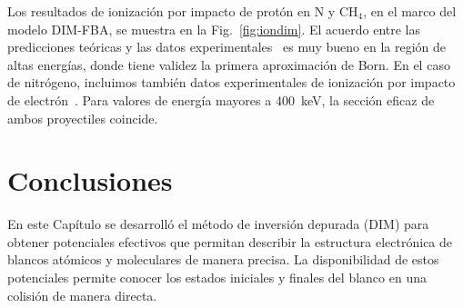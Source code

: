 Los resultados de ionización por impacto de protón en N y CH$_4$, 
en el marco del modelo DIM-FBA, se muestra en la Fig.~\ref{fig:iondim}. 
El acuerdo entre las predicciones teóricas y las datos 
experimentales~\cite{Rudd:83,Rudd:85} es muy bueno en la región de altas 
energías, donde tiene validez la primera aproximación de Born. En el 
caso de nitrógeno, incluimos también datos experimentales de ionización 
por impacto de electrón~\cite{Brook:78}. Para valores de energía mayores 
a 400~keV, la sección eficaz de ambos proyectiles coincide. 

\section{Conclusiones}
\label{sec:conclu-dim}

En este Capítulo se desarrolló el método de inversión depurada (DIM) 
para obtener potenciales efectivos que permitan describir la estructura 
electrónica de blancos atómicos y moleculares de manera precisa. La 
disponibilidad de estos potenciales permite conocer los estados 
iniciales y finales del blanco en una colisión de manera directa. 

